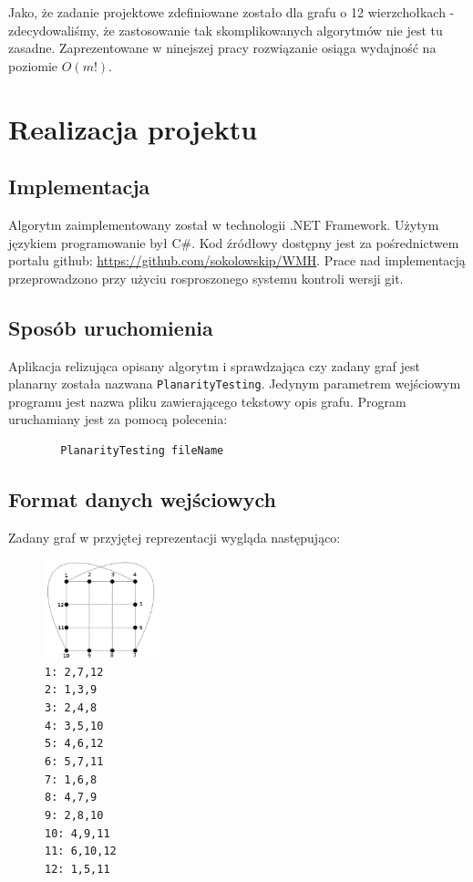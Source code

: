 \documentclass[a4 122pt]{article}
\begin{document}
		Jako, że zadanie projektowe zdefiniowane zostało dla grafu o 12 wierzchołkach - zdecydowaliśmy, że zastosowanie tak skomplikowanych algorytmów nie jest tu zasadne. 
		Zaprezentowane w ninejszej pracy rozwiązanie osiąga wydajność na poziomie $O(m!)$.

	\pagebreak
	
\section{Realizacja projektu}

		
	\subsection{Implementacja}

		Algorytm zaimplementowany został w technologii .NET Framework. Użytym językiem programowanie był C\#.
		Kod źródłowy dostępny jest za pośrednictwem portalu github: \url{https://github.com/sokolowskip/WMH}.
		Prace nad implementacją przeprowadzono przy użyciu rosproszonego systemu kontroli wersji git.

	\subsection{Sposób uruchomienia}
	
		Aplikacja relizująca opisany algorytm i sprawdzająca czy zadany graf jest planarny została nazwana \texttt{PlanarityTesting}. 
		Jedynym parametrem wejściowym programu jest nazwa pliku zawierającego tekstowy opis grafu. Program uruchamiany jest za pomocą polecenia:
		\begin{verbatim}
		PlanarityTesting fileName
		\end{verbatim}
	\subsection{Format danych wejściowych} \label{sec:format}
	
		Zadany graf w przyjętej reprezentacji wygląda następująco:
		\begin{figure}
			\centering
			\includegraphics[width=0.3\textwidth]{include/graf.png}
			\caption*
{
\texttt{1: 2,7,12\\
2: 1,3,9\\
3: 2,4,8\\
4: 3,5,10\\
5: 4,6,12\\
6: 5,7,11\\
7: 1,6,8\\
8: 4,7,9\\
9: 2,8,10\\
10: 4,9,11\\
11: 6,10,12\\
12: 1,5,11}}
		\end{figure}
\end{document}
